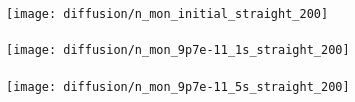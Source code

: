 
\begin{figure}[H]
	\begin{center}
		\vspace{-1em}
		\texttt{[image: diffusion/n\_mon\_initial\_straight\_200]} \\
		\vspace{-4em}  \vspace{2em} \\
		\texttt{[image: diffusion/n\_mon\_9p7e-11\_1s\_straight\_200]} \\
		\vspace{-4em}  \vspace{2em} \\
		\texttt{[image: diffusion/n\_mon\_9p7e-11\_5s\_straight\_200]} \\

\end{center}
\end{figure}
